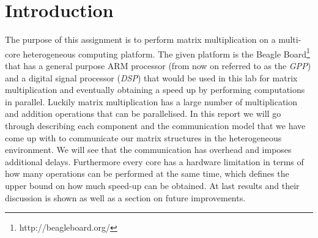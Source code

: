 \newpage
\section{Introduction}

The purpose of this assignment is to perform matrix multiplication on a multi-core heterogeneous computing platform. The given platform is the Beagle Board\footnote{http://beagleboard.org/} that has a general purpose ARM processor (from now on referred to as the \emph{GPP}) and a digital signal processor (\emph{DSP}) that would be used in this lab for matrix multiplication and eventually obtaining a speed up by performing computations in parallel. Luckily matrix multiplication has a large number of multiplication and addition operations that can be parallelised. In this report we will go through describing each component and the communication model that we have come up with to communicate our matrix structures in the heterogeneous environment. We will see that the communication has overhead and imposes additional delays. Furthermore every core has a hardware limitation in terms of how many operations can be performed at the same time, which defines the upper bound on how much speed-up can be obtained. At last results and their discussion is shown as well as a section on future improvements.

